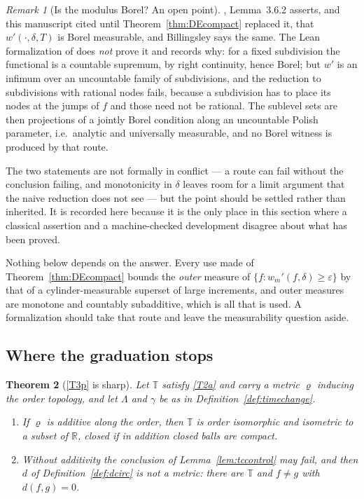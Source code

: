 \documentclass[11pt,a4paper]{article}
\theoremstyle{plain}
\newtheorem{theorem}{Theorem}[section]
\theoremstyle{definition}
\theoremstyle{remark}
\newtheorem{remark}[theorem]{Remark}
\newcommand{\R}{\mathbb{R}}
\newcommand{\T}{\mathbb{T}}                     %
\newcommand{\EK}{\cite{EK86}}
\begin{document}
\begin{remark}[Is the modulus Borel?  An open point]
  \label{rem:modulusborel}
  \EK, Lemma~3.6.2 asserts, and this manuscript cited until
  Theorem~\ref{thm:DEcompact} replaced it, that $w'(\cdot,\delta,T)$ is Borel measurable, and Billingsley
  says the same.  The Lean formalization of \cite{Kuan26} does \emph{not} prove
  it and records why: for a fixed subdivision the functional is a countable
  supremum, by right continuity, hence Borel; but $w'$ is an infimum over an
  uncountable family of subdivisions, and the reduction to subdivisions with
  rational nodes fails, because a subdivision has to place its nodes at the
  jumps of $f$ and those need not be rational.  The sublevel sets are then
  projections of a jointly Borel condition along an uncountable Polish
  parameter, i.e.\ analytic and universally measurable, and no Borel witness is
  produced by that route.

  The two statements are not formally in conflict --- a route can fail without
  the conclusion failing, and monotonicity in $\delta$ leaves room for a limit
  argument that the naive reduction does not see --- but the point should be
  settled rather than inherited.  It is recorded here because it is the only
  place in this section where a classical assertion and a machine-checked
  development disagree about what has been proved.

  Nothing below depends on the answer.  Every use made of
  Theorem~\ref{thm:DEcompact} bounds the \emph{outer} measure of
  $\{f : w_m'(f,\delta) \geq \varepsilon\}$ by that of a cylinder-measurable
  superset of large increments, and outer measures are monotone and countably
  subadditive, which is all that is used.  A formalization should take that
  route and leave the measurability question aside.
\end{remark}

\subsection{Where the graduation stops}
\label{ssec:T3sharp}

\begin{theorem}[\eqref{T3p} is sharp]
  \label{thm:T3sharp}
  Let $\T$ satisfy \eqref{T2a} and carry a metric $\varrho$ inducing the order
  topology, and let $\Lambda$ and $\gamma$ be as in
  Definition~\ref{def:timechange}.
  \begin{enumerate}[label=(\alph*)]
  \item \label{it:T3a}
    If $\varrho$ is additive along the order, then $\T$ is order isomorphic and
    isometric to a subset of $\R$, closed if in addition closed balls are
    compact.
  \item \label{it:T3b}
    Without additivity the conclusion of Lemma~\ref{lem:tccontrol} may fail, and
    then $d$ of Definition~\ref{def:dcirc} is not a metric: there are $\T$ and
    $f \neq g$ with $d(f,g) = 0$.
  \end{enumerate}
\end{theorem}
\end{document}
